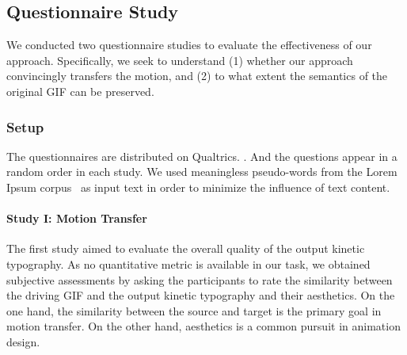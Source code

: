 \subsection{Questionnaire Study}




We conducted two questionnaire studies to evaluate the effectiveness of our approach.
Specifically, we seek to understand (1) whether our approach convincingly transfers the motion, and (2) to what extent the semantics of the original GIF can be preserved.

\subsubsection{Setup} The questionnaires are distributed on Qualtrics.
. And the questions appear in a random order in each study. 
We used meaningless pseudo-words from the Lorem Ipsum corpus~\cite{lorem} as input text in order to minimize the influence of text content.

\paragraph{Study I: Motion Transfer}
The first study aimed to evaluate the overall quality of the output kinetic typography.
As no quantitative metric is available in our task, we obtained subjective assessments by asking the participants to rate the similarity between the driving GIF and the output kinetic typography and their aesthetics.
On the one hand, the similarity between the source and target is the primary goal in motion transfer.
On the other hand, aesthetics is a common pursuit in animation design.



